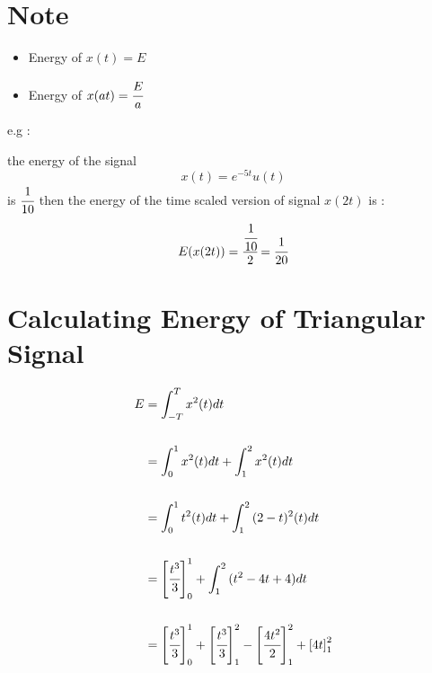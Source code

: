 \documentclass[12pt]{article}
\begin{document}
\section{Note}


\begin{itemize}
	\item Energy of $x(t) = E$
	\item Energy of $x(at) = \cfrac{E}{a}$
\end{itemize}


e.g : 

the energy of the signal 
$$
x(t) = e^{-5t} u(t) 
$$
is $\cfrac{1}{10}$ then the energy of the time scaled version of signal $x(2t)$ is :
$$
E(x(2t)) = \cfrac{\cfrac{1}{10}}{2} = \cfrac{1}{20}
$$





\section{Calculating Energy of Triangular Signal}





\begin{center}
\end{center}





\begin{align*}
E &= \int_{-T}^{T}{x^{2}(t)dt} \\ \\
&= \int_{0}^{1}{x^{2}(t)dt} + \int_{1}^{2}{x^{2}(t)dt} \\ \\ 
&= \int_{0}^{1}{t^{2}(t)dt} + \int_{1}^{2}{(2-t)^{2}(t)dt} \\ \\ 
&= \left[ \cfrac{t^{3}}{3} \right]_{0}^{1}  + \int_{1}^{2}{ (t^{2} - 4t + 4)dt } \\ \\
&= \left[ \cfrac{t^{3}}{3} \right]_{0}^{1} +
\left[ \cfrac{t^{3}}{3} \right]_{1}^{2} - 
\left[ \cfrac{4t^{2}}{2} \right]_{1}^{2} + 
\left[ 4t \right]_{1}^{2}
\end{align*}
\end{document}
